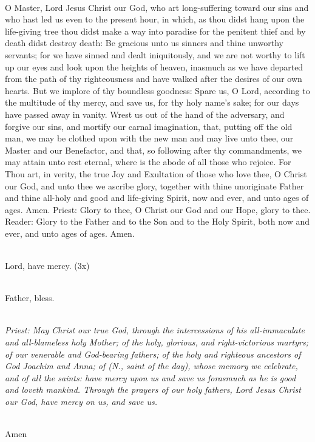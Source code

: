 {\mbox{}\\
O Master, Lord Jesus Christ our God, who art long-suffering toward our sins 
and who hast led us even to the present hour, in which, as thou didst hang 
upon the life-giving tree thou didst make a way into paradise for the penitent 
thief and by death didst destroy death: Be gracious unto us sinners and thine 
unworthy servants; for we have sinned and dealt iniquitously, and we are not 
worthy to lift up our eyes and look upon the heights of heaven, inasmuch as 
we have departed from the path of thy righteousness and have walked after the 
desires of our own hearts. But we implore of thy boundless goodness: Spare 
us, O Lord, according to the multitude of thy mercy, and save us, for thy holy 
name’s sake; for our days have passed away in vanity. Wrest us out of the 
hand of the adversary, and forgive our sins, and mortify our carnal 
imagination, that, putting off the old man, we may be clothed upon with the 
new man and may live unto thee, our Master and our Benefactor, and that, so 
following after thy commandments, we may attain unto rest eternal, where is 
the abode of all those who rejoice. For Thou art, in verity, the true Joy and 
Exultation of those who love thee, O Christ our God, and unto thee we ascribe 
glory, together with thine unoriginate Father and thine all-holy and good and 
life-giving Spirit, now and ever, and unto ages of ages. Amen. 
Priest: Glory to thee, O Christ our God and our Hope, glory to thee. 
Reader: Glory to the Father and to the Son and to the Holy Spirit, both now and ever, 
and unto ages of ages. Amen.

\mbox{}\\
Lord, have mercy. (3x) 

\mbox{}\\
Father, bless.

\mbox{}\\
\emph{Priest: May Christ our true God,
through the intercessions of his all-immaculate and all-blameless holy Mother;
of the holy, glorious, and right-victorious martyrs; 
of our venerable and God-bearing fathers; of the holy and righteous ancestors 
of God Joachim and Anna; of (N., saint of the day), whose memory we 
celebrate, and of all the saints: have mercy upon us and save us forasmuch as 
he is good and loveth mankind. 
Through the prayers of our holy fathers, Lord Jesus Christ our God, have 
mercy on us, and save us.}

\mbox{}\\
Amen
}